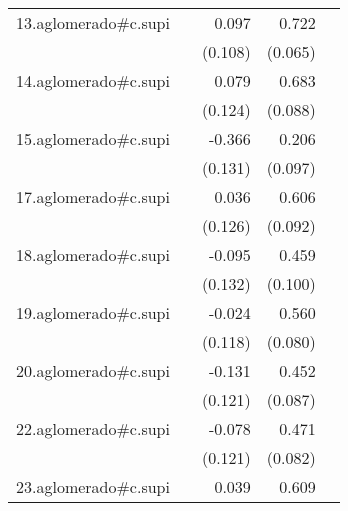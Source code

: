 {\begin{longtable}{l*{4}{D{.}{.}{-1}}}
\addlinespace
13.aglomerado#c.supi&                     &       0.097         &       0.722\sym{***}&                     \\
            &                     &     (0.108)         &     (0.065)         &                     \\
\addlinespace
14.aglomerado#c.supi&                     &       0.079         &       0.683\sym{***}&                     \\
            &                     &     (0.124)         &     (0.088)         &                     \\
\addlinespace
15.aglomerado#c.supi&                     &      -0.366\sym{**} &       0.206\sym{*}  &                     \\
            &                     &     (0.131)         &     (0.097)         &                     \\
\addlinespace
17.aglomerado#c.supi&                     &       0.036         &       0.606\sym{***}&                     \\
            &                     &     (0.126)         &     (0.092)         &                     \\
\addlinespace
18.aglomerado#c.supi&                     &      -0.095         &       0.459\sym{***}&                     \\
            &                     &     (0.132)         &     (0.100)         &                     \\
\addlinespace
19.aglomerado#c.supi&                     &      -0.024         &       0.560\sym{***}&                     \\
            &                     &     (0.118)         &     (0.080)         &                     \\
\addlinespace
20.aglomerado#c.supi&                     &      -0.131         &       0.452\sym{***}&                     \\
            &                     &     (0.121)         &     (0.087)         &                     \\
\addlinespace
22.aglomerado#c.supi&                     &      -0.078         &       0.471\sym{***}&                     \\
            &                     &     (0.121)         &     (0.082)         &                     \\
\addlinespace
23.aglomerado#c.supi&                     &       0.039         &       0.609\sym{***}&                     \\

\end{longtable}}
